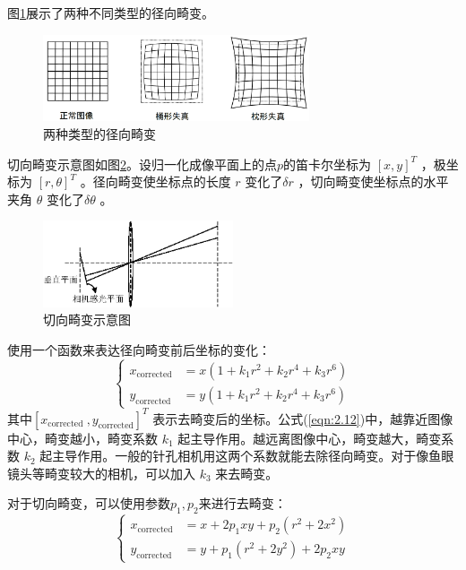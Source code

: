 图\ref{fig2_2}展示了两种不同类型的径向畸变。
\begin{figure}[h]\setlength{\belowcaptionskip}{-12pt}
	\centering
	\includegraphics[width=0.7\textwidth]{figures/chapter2/fig2_2}
	\caption{两种类型的径向畸变}\label{fig2_2}
\end{figure}

切向畸变示意图如图\ref{fig2_3}。设归一化成像平面上的点$p $的笛卡尔坐标为 $[x, y]^{T} $ ，极坐标为 $[r, \theta]^{T} $ 。径向畸变使坐标点的长度 $r $ 变化了$\delta r $  ，切向畸变使坐标点的水平夹角 $\theta$ 变化了$\delta \theta $  。
\begin{figure}[h]\setlength{\belowcaptionskip}{-12pt}
	\centering
	\includegraphics[width=0.5\textwidth]{figures/chapter2/fig2_3}
	\caption{切向畸变示意图}\label{fig2_3}
\end{figure}

使用一个函数来表达径向畸变前后坐标的变化：
\begin{equation}
\label{eqn:2.12}
\left\{\begin{aligned} x_{\text {corrected}} &=x\left(1+k_{1} r^{2}+k_{2} r^{4}+k_{3} r^{6}\right) \\ y_{\text {corrected}} &=y\left(1+k_{1} r^{2}+k_{2} r^{4}+k_{3} r^{6}\right) \end{aligned}\right.
\end{equation}
其中$\left[x_{\text {corrected }}, y_{\text {corrected}}\right]^{T} $ 表示去畸变后的坐标。公式(\ref{eqn:2.12})中，越靠近图像中心，畸变越小，畸变系数 $k_1$  起主导作用。越远离图像中心，畸变越大，畸变系数 $k_2$ 起主导作用。一般的针孔相机用这两个系数就能去除径向畸变。对于像鱼眼镜头等畸变较大的相机，可以加入 $k_3$  来去畸变。

对于切向畸变，可以使用参数$p_1,p_2$来进行去畸变：
\begin{equation}
\label{eqn:2.13}
\left\{
\begin{aligned} 
x_{\text {corrected}} &=x+2 p_{1} x y+p_{2}\left(r^{2}+2 x^{2}\right) \\ 
y_{\text {corrected}} &=y+p_{1}\left(r^{2}+2 y^{2}\right)+2 p_{2} x y 
\end{aligned}
\right.
\end{equation}

